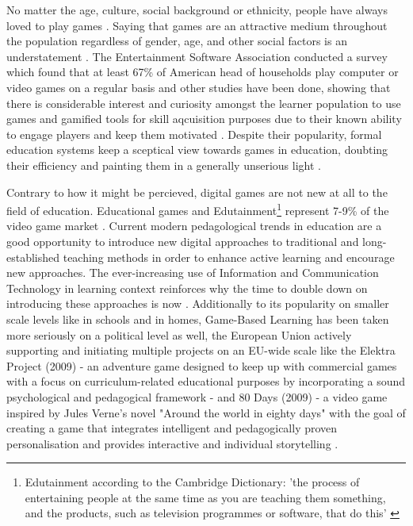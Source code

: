 No matter the age, culture, social background or ethnicity, people have always loved to play games \cite{framework}.
Saying that games are an attractive medium throughout the population regardless of gender, age, and other social factors is an understatement \cite{mmo}.
The Entertainment Software Association conducted a survey which found that at least 67\% of American head of households play computer or video games on a regular basis and other studies have been done, showing that there is considerable interest and curiosity amongst the learner population to use games and gamified tools for skill aqcuisition purposes due to their known ability to engage players and keep them motivated \cite{engage} \cite{framework}.
Despite their popularity, formal education systems keep a sceptical view towards games in education, doubting their efficiency and painting them in a generally unserious light \cite{lifelong}.

Contrary to how it might be percieved, digital games are not new at all to the field of education. Educational games and Edutainment\footnote{Edutainment according to the Cambridge Dictionary: 'the process of entertaining people at the same time as you are teaching them something, and the products, such as television programmes or software, that do this' \cite{cambridge}} represent 7-9\% of the video game market \cite{engage}.
Current modern pedagological trends in education are a good opportunity to introduce new digital approaches to traditional and long-established teaching methods in order to enhance active learning and encourage new approaches. The ever-increasing use of Information and Communication Technology in learning context reinforces why the time to double down on introducing these approaches is now \cite{edu}.
Additionally to its popularity on smaller scale levels like in schools and in homes, Game-Based Learning has been taken more seriously on a political level as well, the European Union actively supporting and initiating multiple projects on an EU-wide scale like the Elektra Project (2009) - an adventure game designed to keep up with commercial games with a focus on curriculum-related educational purposes by incorporating a sound psychological and pedagogical framework \cite{elektra} - and 80 Days (2009) - a video game inspired by Jules Verne's novel "Around the world in eighty days" with the goal of creating a game that integrates intelligent and pedagogically proven personalisation and provides interactive and individual storytelling \cite{eightydays} \cite{lifelong}.

